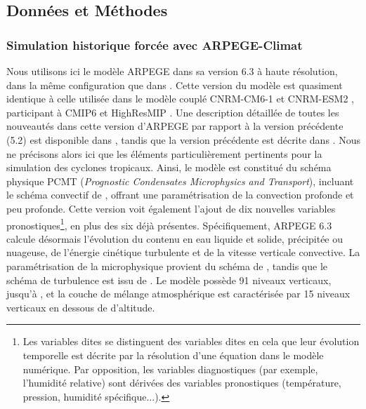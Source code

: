 \documentclass[../main.tex]{subfiles}
\begin{document}
\subsection{Données et Méthodes}

\subsubsection{Simulation historique forcée avec ARPEGE-Climat}

Nous utilisons ici le modèle ARPEGE dans sa version 6.3 à haute résolution, dans la même configuration que dans
\textcite{chauvin_future_2020,cattiaux_projected_2020}. Cette version du modèle est quasiment identique à celle utilisée dans le modèle couplé CNRM-CM6-1
\parencite{voldoire_evaluation_2019} et CNRM-ESM2 \parencite{seferian_evaluation_2019}, participant à CMIP6 \parencite{eyring_overview_2016} et HighResMIP
\parencite{haarsma_highresmip_2020}. Une description détaillée de toutes les nouveautés dans cette version d'ARPEGE par rapport à la version précédente (5.2)
est disponible dans \textcite{voldoire_evaluation_2019}, tandis que la version précédente est décrite dans \textcite{voldoire_cnrmcm5_2013}. Nous ne précisons
alors ici que les éléments particulièrement pertinents pour la simulation des cyclones tropicaux. Ainsi, le modèle est constitué du schéma physique PCMT
(\textit{Prognostic Condensates Microphysics and Transport}), incluant le schéma convectif de \textcite{piriou_approach_2007,gueremy_continuous_2011}, offrant
une paramétrisation de la convection profonde et peu profonde. Cette version voit également l'ajout de dix nouvelles variables pronostiques\footnote{Les
variables dites  se distinguent des variables dites  en cela que leur évolution temporelle est décrite par la
résolution d'une équation dans le modèle numérique. Par opposition, les variables diagnostiques (par exemple, l'humidité relative) sont dérivées des variables
pronostiques (température, pression, humidité spécifique...).}, en plus des six déjà présentes. Spécifiquement, ARPEGE 6.3 calcule désormais l'évolution du
contenu en eau liquide et solide, précipitée ou nuageuse, de l'énergie cinétique turbulente et de la vitesse verticale convective. La paramétrisation de la
microphysique provient du schéma de \textcite{lopez_implementation_2002}, tandis que le schéma de turbulence est issu de \textcite{cuxart_turbulence_2000}. Le
modèle possède \num{91} niveaux verticaux, jusqu'à , et la couche de mélange atmosphérique est caractérisée par \num{15} niveaux verticaux en dessous
de  d'altitude.
\end{document}

